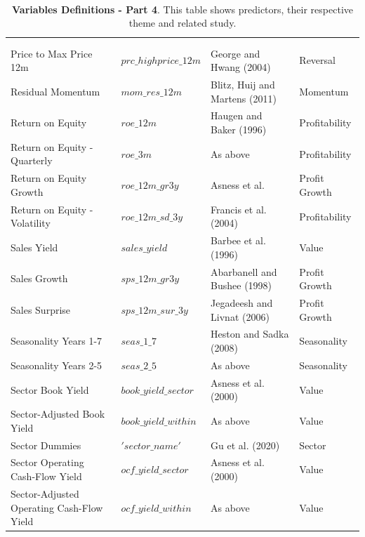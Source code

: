 \documentclass[preprint,12pt,authoryear]{elsarticle}
\begin{document}
\begin{appendices}
      \vspace{1em} %
\begin{table}[pt]
\captionsetup{
  justification=raggedright, %
  labelsep=none,
  singlelinecheck=false, %
  labelformat=boldlabel, %
}
\renewcommand{\arraystretch}{1.25}
\caption[Table 1: \footnotesize ]{\footnotesize \\ \textbf{Variables Definitions - Part 4}. This table shows predictors, their respective theme and related study.}  
\footnotesize %
\begin{tabularx}{\linewidth}{>{\raggedright\arraybackslash}m{3cm}>{\raggedright\arraybackslash}m{3.5cm}>{\raggedright\arraybackslash}m{4cm}>{\raggedright\arraybackslash}m{4cm}}
\hline
\multirow{2}{*}{Definition} & \multirow{2}{*}{Name} & \multirow{2}{*}{Citation} & \multirow{2}{*}{Cluster} \\
& & & \\
\hline
Price to Max Price 12m & $prc\_highprice\_12m$ & George and Hwang (2004)  & Reversal \\
Residual Momentum & $mom\_res\_12m$ & Blitz, Huij and Martens (2011) & Momentum \\
Return on Equity & $roe\_12m$ & Haugen and Baker (1996)  & Profitability \\
Return on Equity - Quarterly & $roe\_3m$ & As above & 
Profitability \\
Return on Equity Growth & $roe\_12m\_gr3y$ & Asness et al. & Profit Growth \\
Return on Equity - Volatility & $roe\_12m\_sd\_3y$ & Francis et al. (2004) & 
Profitability \\
Sales Yield & $sales\_yield$ & Barbee et al. (1996) & Value \\
Sales Growth & $sps\_12m\_gr3y$ & Abarbanell and Bushee (1998) & Profit Growth \\
Sales Surprise & $sps\_12m\_sur\_3y$ & Jegadeesh and Livnat (2006) & Profit Growth \\
Seasonality Years 1-7 & $seas\_1\_7$ & Heston and Sadka (2008) & Seasonality \\
Seasonality Years 2-5 & $seas\_2\_5$ & As above & Seasonality \\
Sector Book Yield & $book\_yield\_sector$ & Asness et al. (2000) & Value \\
Sector-Adjusted Book Yield & $book\_yield\_within$ & As above & Value  \\
Sector Dummies & $'sector\_name'$ & Gu et al. (2020) & Sector \\
Sector Operating Cash-Flow Yield & $ocf\_yield\_sector$ & Asness et al. (2000) & Value \\
Sector-Adjusted Operating Cash-Flow Yield & $ocf\_yield\_within$ & As above & Value \\
\hline
\end{tabularx}
\label{mostcitedarticles}
\end{table}




\end{appendices}
\end{document}
